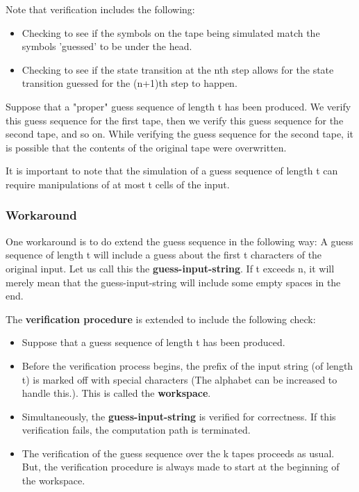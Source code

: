 \documentclass[10pt]{amsart}
\theoremstyle{remark}
\begin{document}
Note that verification includes the following:
\begin{itemize}
\item Checking to see if the symbols on the tape being simulated match the symbols 'guessed' to be under the head.
\item Checking to see if the state transition at the nth step allows for the state transition guessed for the (n+1)th step to happen.
\end{itemize}

Suppose that a "proper" guess sequence of length t has been produced. We verify this guess sequence for the first tape, then we verify this guess sequence for the second tape, and so on. While verifying the guess sequence for the second tape, it is possible that the contents of the original tape were overwritten.

It is important to note that the simulation of a guess sequence of length t can require manipulations of at most t cells of the input.

\subsubsection{Workaround}

One workaround is to do extend the guess sequence in the following way: A guess sequence of length t will include a guess about the first t characters of the original input. Let us call this the \textbf{guess-input-string}. If t exceeds n, it will merely mean that the guess-input-string will include some empty spaces in the end.

The \textbf{verification procedure} is extended to include the following check:
\begin{itemize}
\item Suppose that a guess sequence of length t has been produced.
\item Before the verification process begins, the prefix of the input string (of length t) is marked off with special characters (The alphabet can be increased to handle this.). This is called the \textbf{workspace}.
\item Simultaneously, the \textbf{guess-input-string} is verified for correctness. If this verification fails, the computation path is terminated.
\item The verification of the guess sequence over the k tapes proceeds as usual. But, the verification procedure is always made to start at the beginning of the workspace.
\end{itemize}
\end{document}
